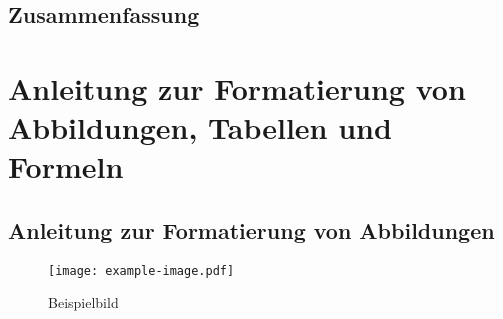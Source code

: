\blindtext[6]

\section{Zusammenfassung}

\blindtext[7]


\chapter{Anleitung zur Formatierung von Abbildungen, Tabellen und Formeln}

\section{Anleitung zur Formatierung von Abbildungen}

\begin{figure}[ht]
  \centering
  \texttt{[image: example-image.pdf]}
  \caption{Beispielbild}
  \label{fig:example}
\end{figure}

